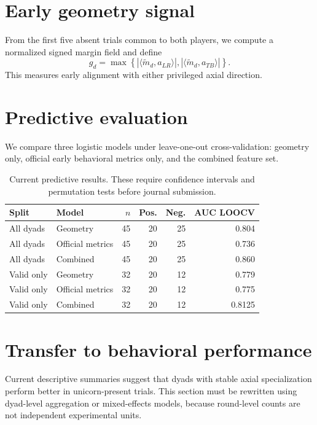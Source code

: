 \documentclass[11pt]{article}
\begin{document}
\section{Early geometry signal}

From the first five absent trials common to both players, we compute a normalized signed margin field and define
\[
 g_d=\max\left\{ |\langle \tilde m_d,a_{LR}\rangle|, |\langle \tilde m_d,a_{TB}\rangle|\right\}.
\]
This measures early alignment with either privileged axial direction.

\section{Predictive evaluation}

We compare three logistic models under leave-one-out cross-validation: geometry only, official early behavioral metrics only, and the combined feature set.

\begin{table}[h]
\centering
\caption{Current predictive results. These require confidence intervals and permutation tests before journal submission.}
\begin{tabular}{llrrrr}
\toprule
Split & Model & $n$ & Pos. & Neg. & AUC LOOCV \\
\midrule
All dyads & Geometry & 45 & 20 & 25 & 0.804 \\
All dyads & Official metrics & 45 & 20 & 25 & 0.736 \\
All dyads & Combined & 45 & 20 & 25 & 0.860 \\
Valid only & Geometry & 32 & 20 & 12 & 0.779 \\
Valid only & Official metrics & 32 & 20 & 12 & 0.775 \\
Valid only & Combined & 32 & 20 & 12 & 0.8125 \\
\bottomrule
\end{tabular}
\end{table}

\section{Transfer to behavioral performance}

Current descriptive summaries suggest that dyads with stable axial specialization perform better in unicorn-present trials. This section must be rewritten using dyad-level aggregation or mixed-effects models, because round-level counts are not independent experimental units.
\end{document}
